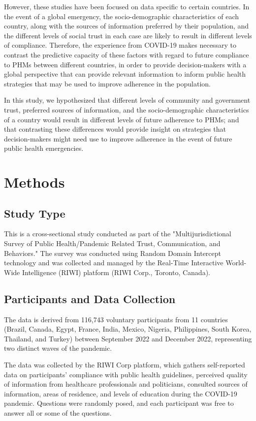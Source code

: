 \documentclass[11pt]{article} %
\begin{document}
However, these studies have been focused on data specific to certain countries. In the event of a global emergency, the socio-demographic characteristics of each country, along with the sources of information preferred by their population, and the different levels of social trust in each case are likely to result in different levels of compliance. Therefore, the experience from COVID-19 makes necessary to contrast the predictive capacity of these factors with regard to future compliance to PHMs between different countries, in order to provide decision-makers with a global perspective that can provide relevant information to inform public health strategies that may be used to improve adherence in the population.

In this study, we hypothesized that different levels of community and government trust, preferred sources of information, and the socio-demographic characteristics of a country would result in different levels of future adherence to PHMs; and that contrasting these differences would provide insight on strategies that decision-makers might need use to improve adherence in the event of future public health emergencies.

    \section{Methods}
\subsection{Study Type}
This is a cross-sectional study conducted as part of the "Multijurisdictional Survey of Public Health/Pandemic Related Trust, Communication, and Behaviors." The survey was conducted using Random Domain Intercept technology and was collected and managed by the Real-Time Interactive World-Wide Intelligence (RIWI) platform (RIWI Corp., Toronto, Canada).

\subsection{Participants and Data Collection}  
The data is derived from 116,743 voluntary participants from 11 countries (Brazil, Canada, Egypt, France, India, Mexico, Nigeria, Philippines, South Korea, Thailand, and Turkey) between September 2022 and December 2022, representing two distinct waves of the pandemic.

The data was collected by the RIWI Corp platform, which gathers self-reported data on participants' compliance with public health guidelines, perceived quality of information from healthcare professionals and politicians, consulted sources of information, areas of residence, and levels of education during the COVID-19 pandemic. Questions were randomly posed, and each participant was free to answer all or some of the questions.
\end{document}
